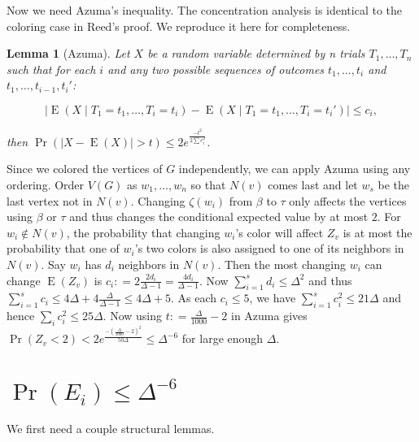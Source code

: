 \documentclass[12pt]{article}
\theoremstyle{plain}
\newtheorem{lem}[thm]{Lemma}
\theoremstyle{definition}
\theoremstyle{remark}
\newcommand{\card}[1]{\left|#1\right|}
\newcommand{\DefinedAs}{\mathrel{\mathop:}=}
\newcommand{\ex}{\operatorname{E}}
\begin{document}
Now we need Azuma's inequality.  The concentration analysis is
identical to the coloring case in Reed's proof.  We reproduce it here for
completeness.

\begin{lem}[Azuma]
Let $X$ be a random variable determined by n trials $T_1, \ldots, T_n$ such that
for each $i$ and any two possible sequences of outcomes $t_1, \ldots, t_i$ and
$t_1, \ldots, t_{i-1}, t_i'$:

\[\card{\ex(X \mid T_1 = t_1, \ldots, T_i = t_i) - \ex(X \mid T_1 = t_1,
\ldots, T_i = t_i')} \leq c_i,\]

\noindent then $\Pr(\card{X - \ex(X)} > t) \leq 2e^{\frac{-t^2}{2\sum c_i^2}}$.
\end{lem}

Since we colored the vertices of $G$ independently, we can apply Azuma using any
ordering.  Order $V(G)$ as $w_1, \ldots, w_n$ so that $N(v)$ comes last and let
$w_s$ be the last vertex not in $N(v)$.  Changing $\zeta(w_i)$ from $\beta$ to
$\tau$ only affects the vertices using $\beta$ or $\tau$ and thus changes the
conditional expected value by at most $2$.  For $w_i \not \in N(v)$, the
probability that changing $w_i$'s color will affect $Z_v$ is at most the probability that one of
$w_i$'s two colors is also assigned to one of its neighbors in $N(v)$.  Say
$w_i$ has $d_i$ neighbors in $N(v)$.  Then the most changing $w_i$ can change
$\ex(Z_v)$ is $c_i \DefinedAs 2\frac{2d_i}{\Delta-1} = \frac{4d_i}{\Delta-1}$. 
Now $\sum_{i=1}^s d_i \leq \Delta^2$ and thus $\sum_{i=1}^s c_i \leq 4\Delta + 4
\frac{\Delta}{\Delta-1} \leq 4\Delta + 5$.  As each $c_i \leq 5$, we have
$\sum_{i=1}^s c_i^2 \leq 21\Delta$ and hence $\sum_i c_i^2 \leq 25\Delta$.  Now
using $t \DefinedAs \frac{\Delta}{1000} - 2$ in Azuma gives $\Pr(Z_v < 2) <
2e^{\frac{-(\frac{\Delta}{1000} - 2)^2}{50\Delta}} \leq \Delta^{-6}$ for large
enough $\Delta$.

\section{$\Pr(E_i) \leq \Delta^{-6}$}
We first need a couple structural lemmas.
\end{document}
